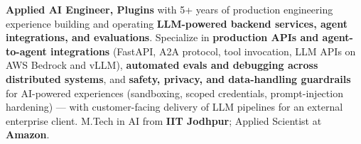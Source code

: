 \documentclass[letter,10pt]{article}
\begin{document}

\textbf{Applied AI Engineer, Plugins} with 5+ years of production engineering experience building and operating \textbf{LLM-powered backend services, agent integrations, and evaluations}.
Specialize in \textbf{production APIs and agent-to-agent integrations} (FastAPI, A2A protocol, tool invocation, LLM APIs on AWS Bedrock and vLLM), \textbf{automated evals and debugging across distributed systems}, and \textbf{safety, privacy, and data-handling guardrails} for AI-powered experiences (sandboxing, scoped credentials, prompt-injection hardening) --- with customer-facing delivery of LLM pipelines for an external enterprise client.
M.Tech in AI from \textbf{IIT Jodhpur}; Applied Scientist at \textbf{Amazon}.
\end{document}
